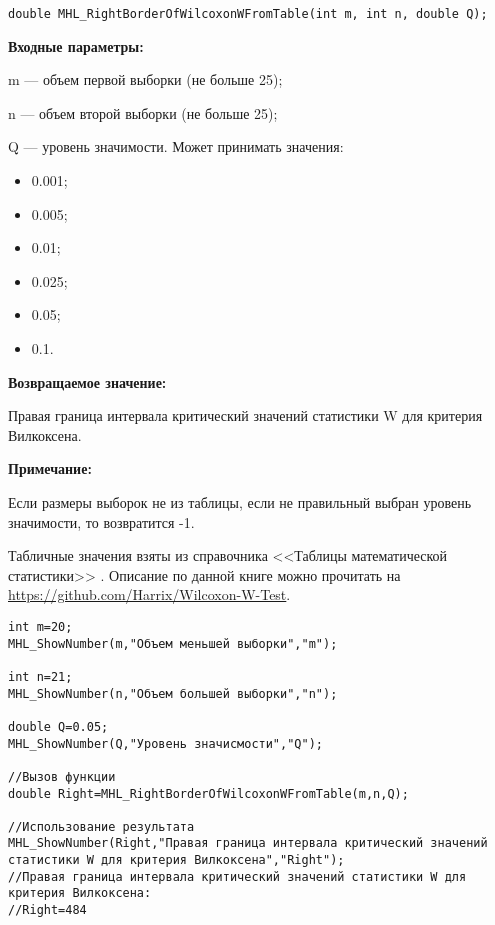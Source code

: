 \documentclass[a4paper,12pt]{article}
\begin{document}
\begin{lstlisting}[label=code_syntax_MHL_RightBorderOfWilcoxonWFromTable,caption=Синтаксис]
double MHL_RightBorderOfWilcoxonWFromTable(int m, int n, double Q);
\end{lstlisting}

\textbf{Входные параметры:}

    m --- объем первой выборки (не больше 25);
 
    n --- объем второй выборки (не больше 25);
 
    Q --- уровень значимости. Может принимать значения:
	
\begin{itemize}
\item 0.001;
\item 0.005; 
\item 0.01; 
\item 0.025; 
\item 0.05; 
\item 0.1.
\end{itemize}

\textbf{Возвращаемое значение:}

Правая граница интервала критический значений статистики W для критерия Вилкоксена.

\textbf{Примечание:}

     Если размеры выборок не из таблицы, если не правильный выбран уровень значимости, то возвратится -1.
	 
	 Табличные значения взяты из  справочника <<Таблицы математической статистики>> \cite[с. 357]{book:Bolshev1983}. Описание по данной книге можно прочитать на \href {https://github.com/Harrix/Wilcoxon-W-Test} {https://github.com/Harrix/Wilcoxon-W-Test}.



\begin{lstlisting}[label=code_use_MHL_RightBorderOfWilcoxonWFromTable,caption=Пример использования]
int m=20;
MHL_ShowNumber(m,"Объем меньшей выборки","m");

int n=21;
MHL_ShowNumber(n,"Объем большей выборки","n");

double Q=0.05;
MHL_ShowNumber(Q,"Уровень значисмости","Q");

//Вызов функции
double Right=MHL_RightBorderOfWilcoxonWFromTable(m,n,Q);

//Использование результата
MHL_ShowNumber(Right,"Правая граница интервала критический значений статистики W для критерия Вилкоксена","Right");
//Правая граница интервала критический значений статистики W для критерия Вилкоксена:
//Right=484
\end{lstlisting}
\end{document}
